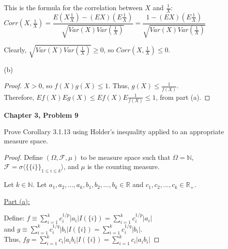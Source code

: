 \documentclass[12pt,letterpaper, onecolumn]{exam}
\newcommand{\real}{\mathbb{R}}
\newcommand{\nat}{\mathbb{N}}
\newcommand{\calF}{\mathcal{F}}
\newcommand{\gensig}[1]{\sigma\langle #1 \rangle} %
\newcommand{\ksum}{\sum_{i = 1}^{k}}
\begin{document}
\begin{questions}
\begin{solution}
    This is the formula for the correlation between $X$ and $\frac{1}{X}$: \\
    $Corr(X, \tfrac{1}{X}) = \dfrac{E(X\frac{1}{X}) - (EX) (E\tfrac{1}{X})}{\sqrt{Var(X)Var(\tfrac{1}{X})}} = \dfrac{1 - (EX) (E\tfrac{1}{X})}{\sqrt{Var(X)Var(\tfrac{1}{X})}}$

    Clearly, $\sqrt{Var(X)Var(\tfrac{1}{X})} \geq 0$, so $Corr(X, \tfrac{1}{X}) \leq 0$.
    
    (b) 
    \begin{proof}
       $X > 0$, so $f(X)g(X) \leq 1$. Thus, $g(X) \leq \frac{1}{f(X)}$. \\
       Therefore, $Ef(X)Eg(X) \leq Ef(X) E \frac{1}{f(X)} \leq 1$, from part (a).
    \end{proof}
    \end{solution}

    \question \textbf{Chapter 3, Problem 9}

    Prove Corollary 3.1.13 using H$\ddot{o}$lder's inequality applied to an appropriate measure space. 

    
    \begin{solution}
    \begin{proof}
Define $(\Omega, \calF, \mu)$ to be measure space such that $\Omega = \nat$, $\calF = \gensig{\{\{i\}\}_{1 \leq i \leq k}}$, and $\mu$ is the counting measure.

Let $k \in \nat$. Let $a_1, a_2, ... , a_k, b_1, b_2, ... , b_k \in \real$ and $c_1, c_2, ... , c_k \in \real_+$. 

\underline{Part (a):}

Define: $f \equiv \ksum c_i^{1/p}|a_i|I(\{i\}) = \ksum c_i^{1/p}|a_i|$ \\ and $g \equiv \ksum c_i^{1/q}|b_i|I(\{i\}) = \ksum c_i^{1/q}|b_i|$. \\ Thus, $fg = \ksum c_i|a_ib_i|I(\{i\}) = \ksum c_i|a_ib_i|$


\end{proof}
\end{solution}
\end{questions}
\end{document}
